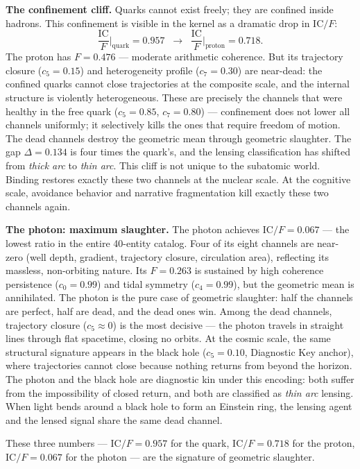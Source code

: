 \documentclass[
  aps,
  prd,
  twocolumn,
  superscriptaddress,
  nofootinbib,
  floatfix
]{revtex4-2}
\newcommand{\beq}{\begin{equation}}
\newcommand{\eeq}{\end{equation}}
\newcommand{\IC}{\mathrm{IC}}
\begin{document}
\textbf{The confinement cliff.}
Quarks cannot exist freely; they are confined inside hadrons.
This confinement is visible in the kernel as a dramatic drop
in $\IC/F$:
\beq\label{eq:confinement}
  \frac{\IC}{F}\bigg|_{\text{quark}} = 0.957
  \;\;\longrightarrow\;\;
  \frac{\IC}{F}\bigg|_{\text{proton}} = 0.718.
\eeq
The proton has $F = 0.476$ --- moderate arithmetic coherence.
But its trajectory closure ($c_5 = 0.15$) and heterogeneity
profile ($c_7 = 0.30$) are near-dead: the confined quarks
cannot close trajectories at the composite scale, and the
internal structure is violently heterogeneous.  These are
precisely the channels that were healthy in the free quark
($c_5 = 0.85$, $c_7 = 0.80$) --- confinement does not lower
all channels uniformly; it selectively kills the ones that
require freedom of motion.  The dead channels destroy the
geometric mean through geometric slaughter.  The gap
$\Delta = 0.134$ is four times the quark's, and the
lensing classification has shifted from \emph{thick arc}
to \emph{thin arc}.
This cliff is not unique to the subatomic world.  Binding
restores exactly these two channels at the nuclear scale.
At the cognitive scale, avoidance behavior and narrative
fragmentation kill exactly these two channels again.

\textbf{The photon: maximum slaughter.}
The photon achieves $\IC/F = 0.067$ --- the lowest ratio in
the entire 40-entity catalog.  Four of its eight channels are
near-zero (well depth, gradient, trajectory closure,
circulation area), reflecting its massless, non-orbiting
nature.  Its $F = 0.263$ is sustained by high coherence
persistence ($c_0 = 0.99$) and tidal symmetry ($c_4 = 0.99$),
but the geometric mean is annihilated.  The photon is the
pure case of geometric slaughter: half the channels are
perfect, half are dead, and the dead ones win.
Among the dead channels, trajectory closure ($c_5 \approx 0$)
is the most decisive --- the photon travels in straight lines
through flat spacetime, closing no orbits.  At the cosmic
scale, the same structural signature appears in the
black hole ($c_5 = 0.10$, Diagnostic Key anchor), where
trajectories cannot close because nothing returns from beyond
the horizon.  The photon and the black hole are diagnostic
kin under this encoding: both suffer from the impossibility
of closed return, and both are classified as \emph{thin arc}
lensing.  When light bends around a black hole to form
an Einstein ring, the lensing agent and the lensed signal
share the same dead channel.

These three numbers --- $\IC/F = 0.957$ for the quark,
$\IC/F = 0.718$ for the proton, $\IC/F = 0.067$ for
the photon --- are the signature of geometric slaughter.
\end{document}
